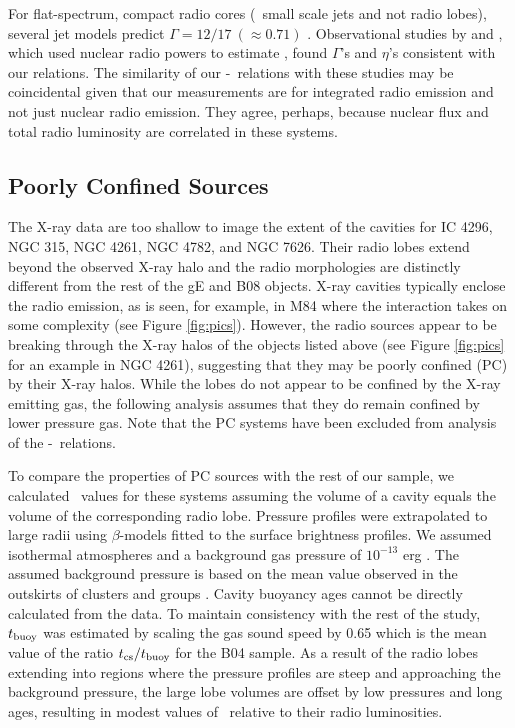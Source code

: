 \documentclass{emulateapj}
\begin{document}
For flat-spectrum, compact radio cores (\ie\ small scale jets and not
radio lobes), several jet models predict $\Gamma = 12/17 ~(\approx
0.71)$ \citep{1979ApJ...232...34B, 1995A&A...293..665F,
  2003MNRAS.343L..59H}. Observational studies by
\citet{2005ApJ...633..384H} and \citet{2007MNRAS.381..589M}, which
used nuclear radio powers to estimate \pjet, found $\Gamma$'s and
$\eta$'s consistent with our relations. The similarity of our
\pjet-\prad\ relations with these studies may be coincidental given
that our measurements are for integrated radio emission and not just
nuclear radio emission. They agree, perhaps, because nuclear flux and
total radio luminosity are correlated in these systems.

\subsection{Poorly Confined Sources}
\label{sec:jet}

The X-ray data are too shallow to image the extent of the cavities for
IC 4296, NGC 315, NGC 4261, NGC 4782, and NGC 7626. Their radio lobes
extend beyond the observed X-ray halo and the radio morphologies are
distinctly different from the rest of the gE and B08 objects. X-ray
cavities typically enclose the radio emission, as is seen, for
example, in M84 \citep{2001ApJ...547L.107F, 2008ApJ...686..911F} where
the interaction takes on some complexity (see Figure
\ref{fig:pics}). However, the radio sources appear to be breaking
through the X-ray halos of the objects listed above (see Figure
\ref{fig:pics} for an example in NGC 4261), suggesting that they may
be poorly confined (PC) by their X-ray halos. While the lobes do not
appear to be confined by the X-ray emitting gas, the following
analysis assumes that they do remain confined by lower pressure
gas. Note that the PC systems have been excluded from analysis of the
\pjet-\prad\ relations.

To compare the properties of PC sources with the rest of our sample,
we calculated \pcav\ values for these systems assuming the volume of a
cavity equals the volume of the corresponding radio lobe. Pressure
profiles were extrapolated to large radii using $\beta$-models
\citep{betamodel} fitted to the surface brightness profiles. We
assumed isothermal atmospheres and a background gas pressure of
$10^{-13}$ erg \pcc. The assumed background pressure is based on the
mean value observed in the outskirts of clusters and groups
\citep{accept}. Cavity buoyancy ages cannot be directly calculated
from the data. To maintain consistency with the rest of the study,
$t_{\rm{buoy}}$ was estimated by scaling the gas sound speed by 0.65
which is the mean value of the ratio $t_{\rm{cs}}/t_{\rm{buoy}}$ for
the B04 sample. As a result of the radio lobes extending into regions
where the pressure profiles are steep and approaching the background
pressure, the large lobe volumes are offset by low pressures and long
ages, resulting in modest values of \pcav\ relative to their radio
luminosities.
\end{document}
